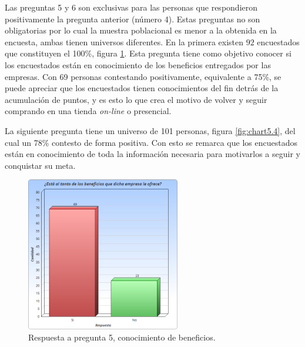Las preguntas 5 y 6 son exclusivas para las personas que respondieron positivamente
la pregunta anterior (número 4).
Estas preguntas no son obligatorias por lo cual la muestra poblacional
es menor a la obtenida en la encuesta, ambas tienen universos diferentes.
En la primera existen $92$ encuestados que constituyen el 100\%, figura  \ref{fig:chart5.3}.
Esta pregunta tiene como objetivo conocer si los encuestados están en conocimiento
de los beneficios entregados por las empresas.
Con 69 personas contestando positivamente, equivalente a 75\%, se puede apreciar
que los encuestados tienen conocimientos del fin detrás de la acumulación de puntos,
y es esto lo que crea el motivo de volver y seguir comprando en una tienda
\emph{on-line} o presencial.

La siguiente pregunta tiene un universo de 101 personas, figura  \ref{fig:chart5.4},
del cual un 78\% contesto de forma positiva.
Con esto se remarca que los encuestados están en conocimiento de toda la
información necesaria para motivarlos a seguir y conquistar su meta.

\begin{figure}[!htb]
    \centering
    \includegraphics[width=0.6\textwidth]{images/Graficos/graf_5_3.png}
    \caption[chart5.3]{Respuesta a pregunta 5, conocimiento de beneficios.}
    \label{fig:chart5.3}
\end{figure}

